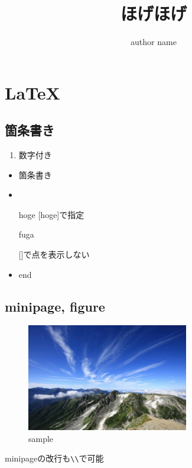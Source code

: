 \documentclass{jsarticle}
\title{ほげほげ}
\author{author name}
\date{} %
\begin{document}
\maketitle %
\tableofcontents %

\section{\LaTeX}
\subsection{箇条書き}

\begin{enumerate}
\item 数字付き
\end{enumerate}

\begin{itemize}
\item 箇条書き
\item 
\item [hoge] [hoge]で指定
\item [fuga]
\item [] []で点を表示しない
\item end
\end{itemize}

\subsection{minipage, figure}

\begin{table}[H]
  \begin{minipage}{.5\textwidth}
    \begin{figure}[H]
      \centering
      \includegraphics[width=200pt]{sample.png}
      \caption{sample}
    \end{figure}
  \end{minipage}
  \begin{minipage}{.5\textwidth}
    minipageの改行も\verb|\\|で可能
  \end{minipage}
\end{table}
\end{document}
